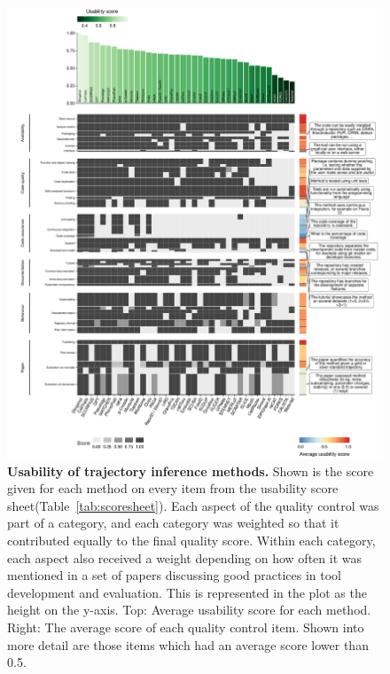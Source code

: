 \begin{figure}[tbh!]
	\centering\includegraphics[width=0.9\linewidth]{fig/supfigure_6.pdf}
	\caption{
		\textbf{Usability of trajectory inference methods.}
		Shown is the score given for each method on every item from the usability score sheet(Table~\ref{tab:scoresheet}). Each aspect of the quality control was part of a category, and each category was weighted so that it contributed equally to the final quality score. Within each  category,  each  aspect  also  received  a  weight  depending  on  how  often  it  was mentioned  in  a set  of  papers  discussing  good practices in tool development and evaluation. This is represented in the plot as the height on the y-axis. Top: Average usability score for each method. Right: The average score of each quality control item. Shown into more detail are those items which had an average score lower than 0.5.
	}
	\label{fig:supfigure_6}
\end{figure}


